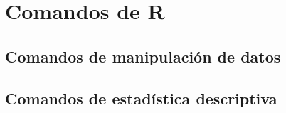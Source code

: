 
\chapter{Comandos de R}

\section{Comandos de manipulación de datos}

\section{Comandos de estadística descriptiva}